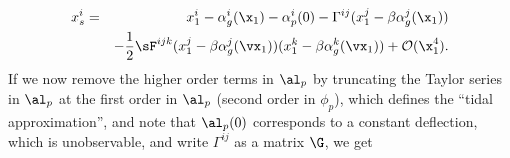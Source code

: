 \begin{eqnarray}
x^i_s &=& x^i_1 - \alpha^i_g(\x_1) - \alpha_p^i(0) - \Gamma^{ij} (x^j_1 - \beta \alpha^j_g(\x_1)) \nonumber \\
&&- \frac{1}{2} \sF^{ijk} (x^j_1 - \beta \alpha^j_g(\vx_1)) (x^k_1 - \beta \alpha^k_g(\vx_1)) + \mathcal{O}(\x_1^4) .
\end{eqnarray}
\normalsize
If we now remove the higher order terms in $\al_p$ by truncating the Taylor series in $\al_p$ at the first order in $\al_p$ (second order in $\phi_p$), which defines the ``tidal approximation'', and note that $\al_p(0)$ corresponds to a constant deflection, which is unobservable, and write $\Gamma^{ij}$ as a matrix $\G$, we get
  